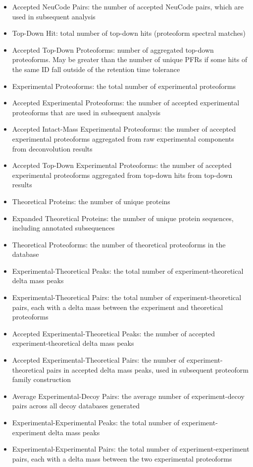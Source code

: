\begin{itemize}
\begin{itemize}
\item Accepted NeuCode Pairs: the number of accepted NeuCode pairs, which are used in subsequent analysis
\item Top-Down Hit: total number of top-down hits (proteoform spectral matches)
\item Accepted Top-Down Proteoforms: number of aggregated top-down proteoforms. May be greater than the number of unique PFRs if some hits of the same ID fall outside of the retention time tolerance
\item Experimental Proteoforms: the total number of experimental proteoforms
\item Accepted Experimental Proteoforms: the number of accepted experimental proteoforms that are used in subsequent analysis
\item Accepted Intact-Mass Experimental Proteoforms: the number of accepted experimental proteoforms aggregated from raw experimental components from deconvolution results
\item Accepted Top-Down Experimental Proteoforms: the number of accepted experimental proteoforms aggregated from top-down hits from top-down results
\item Theoretical Proteins: the number of unique proteins
\item Expanded Theoretical Proteins: the number of unique protein sequences, including annotated subsequences
\item Theoretical Proteoforms: the number of theoretical proteoforms in the database
\item Experimental-Theoretical Peaks: the total number of experiment-theoretical delta mass peaks
\item Experimental-Theoretical Pairs: the total number of experiment-theoretical pairs, each with a delta mass between the experiment and theoretical proteoforms
\item Accepted Experimental-Theoretical Peaks: the number of accepted experiment-theoretical delta mass peaks
\item Accepted Experimental-Theoretical Pairs: the number of experiment-theoretical pairs in accepted delta mass peaks, used in subsequent proteoform family construction
\item Average Experimental-Decoy Pairs: the average number of experiment-decoy pairs across all decoy databases generated
\item Experimental-Experimental Peaks: the total number of experiment-experiment delta mass peaks
\item Experimental-Experimental Pairs: the total number of experiment-experiment pairs, each with a delta mass between the two experimental proteoforms

\end{itemize}
\end{itemize}
